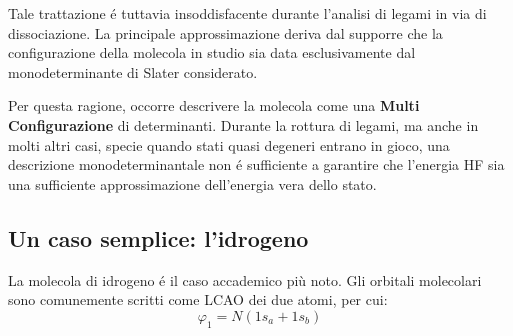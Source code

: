 Tale trattazione \'e tuttavia insoddisfacente durante l'analisi di
legami in via di dissociazione. La principale approssimazione deriva dal
supporre che la configurazione della molecola in studio sia data
esclusivamente dal monodeterminante di Slater considerato. 

Per questa ragione, occorre descrivere la molecola come una \textbf{Multi
Configurazione} di determinanti. Durante la rottura di legami, ma anche
in molti altri casi, specie quando stati quasi degeneri entrano in
gioco, una descrizione monodeterminantale non \'e sufficiente a garantire
che l'energia HF sia una sufficiente approssimazione dell'energia vera
dello stato.

\subsection{Un caso semplice: l'idrogeno}

La molecola di idrogeno \'e il caso accademico pi\`u noto. Gli orbitali
molecolari sono comunemente scritti come LCAO dei due atomi, per cui:
$$
\varphi_1=N \left(1s_a + 1s_b \right)
$$

